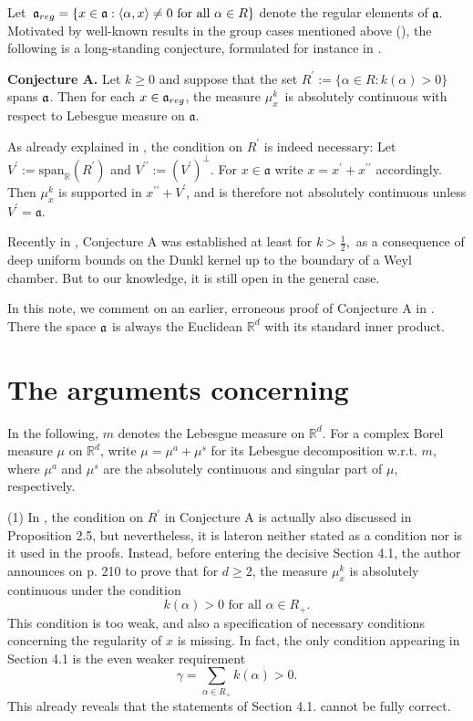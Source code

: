 \documentclass[reqno]{amsart}
\theoremstyle{plain}
\theoremstyle{definition}
\theoremstyle{remark}
\numberwithin{equation}{section}
\begin{document}
  Let $\,\frak a_{reg}= \{x\in \frak a: \langle\alpha, x\rangle\not=0 \text{ for all }\alpha \in R\}$
  denote the regular elements of $\frak a.$ 
  Motivated by well-known results in the group cases mentioned above (\cite[Ch.IV, Prop. 4.10 and Ch.II, Thm. 10.11]{H00}), the following is a long-standing conjecture, formulated for instance in \cite{RJ02}. 
   
  \bigskip\noindent
  \textbf{Conjecture A.} Let $k \geq 0$ and suppose that the set 
  $R^\prime:= \{\alpha\in R: k(\alpha)>0\}$ spans $\frak a$. 
  Then for each $x \in \frak a_{reg}$, the measure $\mu_x^k\,$ is absolutely continuous with respect to Lebesgue measure on $\mathfrak a.$ 
  
  \medskip
    
  
     
 As already explained in \cite{RJ02},  the condition on $R^\prime$ is indeed necessary:  Let $V^\prime:=\text{span}_\mathbb R(R^\prime)$ and $V^{\prime\prime}:= (V^\prime)^\perp.$ For $x\in \mathfrak a$ write $x=x^\prime+ x^{\prime\prime}$ accordingly. Then $\mu_x^k$ is supported in  $x^{\prime\prime} +V^{\prime} $, and is therefore not absolutely 
 continuous unless $V^\prime =\mathfrak a.$ 
 
 \medskip
  
 
 Recently in \cite{L26},  Conjecture A was established at least for $k>\frac{1}{2}, $ as a consequence of deep uniform bounds on the Dunkl kernel up to the boundary of a Weyl chamber. But to our knowledge, it is still open in the general case.
 
 \medskip
 
  In this note, we comment on an earlier, erroneous proof of Conjecture A in \cite{T10}. There the space $\frak a$ is always the Euclidean $\mathbb R^d$ with its standard inner product.
  
 \section{The arguments concerning \cite{T10}}
 
  In the following, $m$ denotes  the Lebesgue measure on $\mathbb R^d$. For a complex Borel measure $\mu$ on $\mathbb R^d$, write $\mu = \mu^a + \mu^s$ for its Lebesgue decomposition w.r.t. $m,$ where $\mu^a$ and $\mu^s$ are the  absolutely continuous and singular part of $\mu$, respectively.   
   
 \bigskip\noindent
 (1)
 In \cite{T10}, the condition on $R^\prime$ in Conjecture A is  actually also discussed in Proposition 2.5, but nevertheless, it is lateron neither stated as a condition nor is it used in the proofs. 
Instead, before entering the decisive Section 4.1, the author announces on p. 210 to prove that for $d\geq 2$, the measure $\mu_x^k$ is absolutely continuous 
 under the condition 
 $$ k(\alpha)>0 \text{ for all } \alpha\in R_+.$$
 This condition is too weak, and also a specification of necessary conditions concerning the regularity of $x$ is missing. In fact, the only condition appearing in Section 4.1 is the  even weaker requirement
 $$\gamma = \sum_{\alpha\in R_+} k(\alpha) >0.$$
 This already reveals that the statements of Section 4.1. cannot be fully correct.
 
\end{document}
